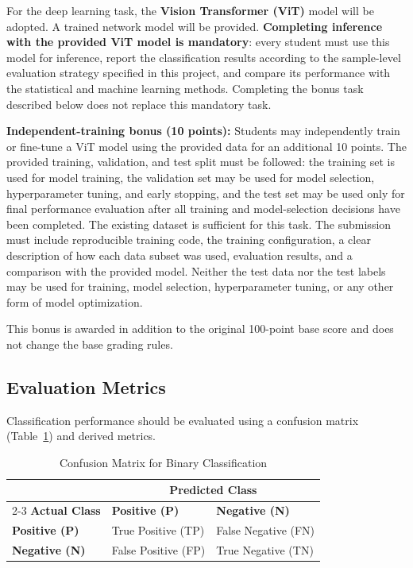 \documentclass[11pt]{article}
\begin{document}
For the deep learning task, the \textbf{Vision Transformer (ViT)} model will be adopted. A trained network model will be provided. \textbf{Completing inference with the provided ViT model is mandatory}: every student must use this model for inference, report the classification results according to the sample-level evaluation strategy specified in this project, and compare its performance with the statistical and machine learning methods. Completing the bonus task described below does not replace this mandatory task.

\textbf{Independent-training bonus (10 points):} Students may independently train or fine-tune a ViT model using the provided data for an additional 10 points. The provided training, validation, and test split must be followed: the training set is used for model training, the validation set may be used for model selection, hyperparameter tuning, and early stopping, and the test set may be used only for final performance evaluation after all training and model-selection decisions have been completed. The existing dataset is sufficient for this task. The submission must include reproducible training code, the training configuration, a clear description of how each data subset was used, evaluation results, and a comparison with the provided model. Neither the test data nor the test labels may be used for training, model selection, hyperparameter tuning, or any other form of model optimization.

This bonus is awarded in addition to the original 100-point base score and does not change the base grading rules.

\subsection{Evaluation Metrics}

Classification performance should be evaluated using a confusion matrix (Table~\ref{tab:confusion}) and derived metrics.

\begin{table}[htbp]
\centering
\caption{Confusion Matrix for Binary Classification}
\label{tab:confusion}
\begin{tabular}{lll}
\toprule
& \multicolumn{2}{c}{\textbf{Predicted Class}} \\
\cmidrule(lr){2-3}
\textbf{Actual Class} & \textbf{Positive (P)} & \textbf{Negative (N)} \\
\midrule
\textbf{Positive (P)} & True Positive (TP) & False Negative (FN) \\
\textbf{Negative (N)} & False Positive (FP) & True Negative (TN) \\
\bottomrule
\end{tabular}
\end{table}
\end{document}
